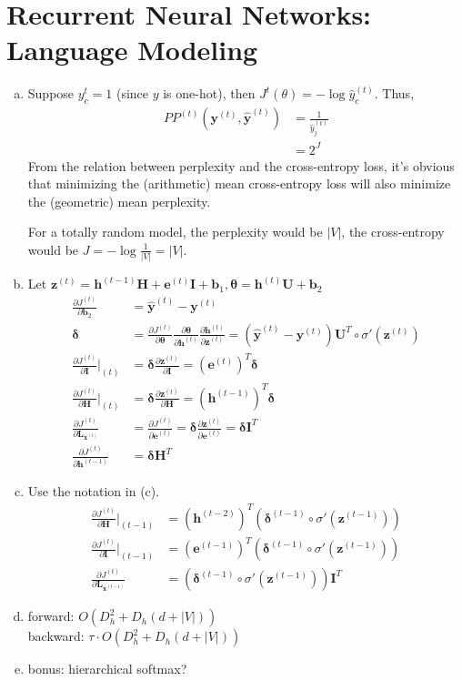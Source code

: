 \documentclass[11pt]{article}
\newcommand{\pder}[2][]{\frac{\partial#1}{\partial#2}}
\newcommand{\Jt}{J^{(t)}}
\newcommand{\pderJt}[1]{\pder[\Jt]{#1}}
\newcommand{\bh}{\bm{h}}
\newcommand{\bH}{\bm{H}}
\newcommand{\bL}{\bm{L}}
\newcommand{\be}{\bm{e}}
\newcommand{\bb}{\bm{b}}
\newcommand{\bU}{\bm{U}}
\newcommand{\bI}{\bm{I}}
\newcommand{\by}{\bm{y}}
\newcommand{\bx}{\bm{x}}
\newcommand{\bz}{\bm{z}}
\newcommand{\byhat}{\hat{\by}}
\newcommand{\btheta}{\bm{\theta}}
\newcommand{\bdelta}{\bm{\delta}}
\newcommand{\bht}[1][t]{\bh^{(#1)}}
\newcommand{\byt}[1][t]{\by^{(#1)}}
\newcommand{\byhatt}[1][t]{\byhat^{(#1)}}
\newcommand{\bet}[1][t]{\be^{(#1)}}
\newcommand{\bxt}[1][t]{\bx^{(#1)}}
\newcommand{\bzt}[1][t]{\bz^{(#1)}}
\newcommand{\bdeltat}[1][t-1]{\bdelta^{(#1)}}
\begin{document}
\section{Recurrent Neural Networks: Language Modeling}
\label{sec:3}

\begin{enumerate}[(a)]
\item Suppose $y_c^{t} = 1$ (since $y$ is one-hot), then $J^t(\theta) = - \log
  \hat{y}_c^{(t)}$.
  Thus,
  \begin{align*}
    PP^{(t)}(\bm{y}^{(t)}, \hat{\bm{y}}^{(t)}) &= \frac{1}{\hat{y}_j^{(t)}} \\
    &= 2^J
  \end{align*}
    From the relation between perplexity and the cross-entropy loss, it's
    obvious that minimizing the (arithmetic) mean cross-entropy loss will also
    minimize the (geometric) mean perplexity.

    For a totally random model, the perplexity would be $|V|$, the cross-entropy
    would be $J = - \log \frac{1}{|V|} = |V|$.
    
  \item Let $\bzt = \bht[t-1]\bH + \bet\bI + \bb_1, \btheta = \bht\bU + \bb_2$
    \begin{align*}
      \pder[J^{(t)}]{\bm{b}_2} &= \hat{\bm{y}}^{(t)} - \bm{y}^{(t)} \\
      \bdelta &= \pderJt{\btheta}\pder[\btheta]{\bht}\pder[\bht]{\bzt}= (\byhatt - \byt)\bU^T\circ \sigma'(\bzt) \\
      \pderJt{\bI}\Bigr|_{(t)} &= \bdelta \pder[\bzt]{\bI} = (\bet)^T\bdelta \\
      \pderJt{\bH}\Bigr|_{(t)} &= \bdelta \pder[\bzt]{\bH} = (\bht[t-1])^T\bdelta \\
      \pderJt{\bL_{\bxt}} &= \pderJt{\bet} = \bdelta \pder[\bzt]{\bet} = \bdelta\bI^T \\
      \pderJt{\bht[t-1]} &= \bdelta \bH^T
    \end{align*}
  \item Use the notation in (c).
    \begin{align*}
      \pderJt{\bH}\Bigr|_{(t-1)} &= (\bht[t-2])^T(\bdeltat\circ \sigma'(\bzt[t-1])) \\
      \pderJt{\bI}\Bigr|_{(t-1)} &= (\bet[t-1])^T(\bdeltat\circ \sigma'(\bzt[t-1])) \\
      \pderJt{\bL_{\bxt[t-1]}} &= (\bdeltat\circ \sigma'(\bzt[t-1]))\bI^T 
    \end{align*}
  \item forward: $O(D_h^2 + D_h(d + |V|))$ \\
        backward: $\tau \cdot O(D_h^2 + D_h(d + |V|))$
  \item bonus: hierarchical softmax?
    
\end{enumerate}
\end{document}
